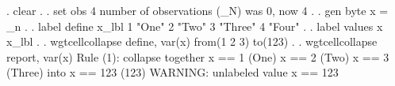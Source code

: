 {\smallskip}
. clear
{\smallskip}
.
. set obs 4
number of observations (_N) was 0, now 4
{\smallskip}
.
. gen byte x = _n
{\smallskip}
.
. label define x_lbl 1 "One" 2 "Two" 3 "Three" 4 "Four"
{\smallskip}
.
. label values x x_lbl
{\smallskip}
.
. wgtcellcollapse define, var(x) from(1 2 3) to(123)
{\smallskip}
.
. wgtcellcollapse report, var(x)
{\smallskip}
Rule (1): collapse together
  x == 1 (One)
  x == 2 (Two)
  x == 3 (Three)
  into x == 123 (123)
  WARNING: unlabeled value x == 123
{\smallskip}

